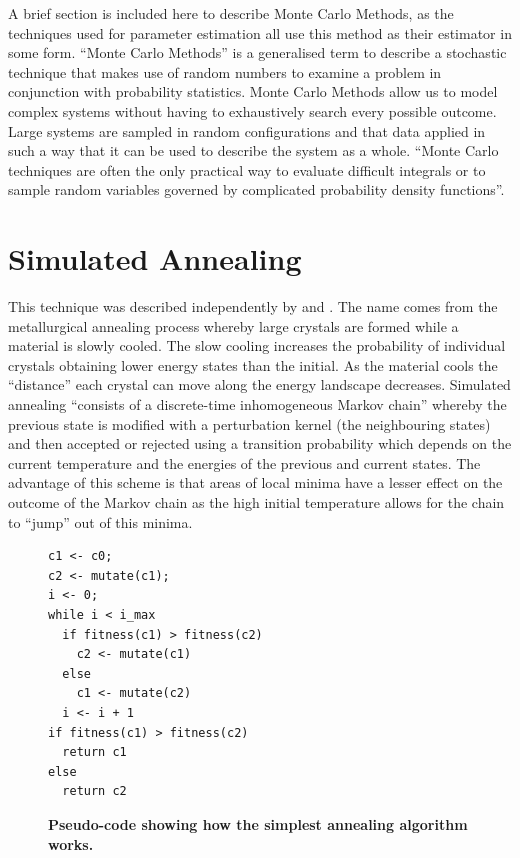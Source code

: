 A brief section is included here to describe Monte Carlo Methods, as the techniques used for parameter estimation all use this method as their estimator in some form.
``Monte Carlo Methods'' is a generalised term to describe a stochastic technique that makes use of random numbers to examine a problem in conjunction with probability statistics. Monte Carlo Methods allow us to model complex systems without having to exhaustively search every possible outcome. Large systems are sampled in random configurations and that data applied in such a way that it can be used to describe the system as a whole. ``Monte Carlo techniques are often the only practical way to evaluate difficult integrals or to sample random variables governed by complicated probability density functions''\cite{Nakamura2010}.

\section{Simulated Annealing}

This technique was described independently by \citet{Kirkpatrick1983} and \citet{Cerny1985}. The name comes from the metallurgical annealing process whereby large crystals are formed while a material is slowly cooled. The slow cooling increases the probability of individual crystals obtaining lower energy states than the initial. As the material cools the ``distance'' each crystal can move along the energy landscape decreases.
Simulated annealing ``consists of a discrete-time inhomogeneous Markov chain''\cite{Bertsimas1993} whereby the previous state is modified with a perturbation kernel (the neighbouring states) and then accepted or rejected using a transition probability which depends on the current temperature and the energies of the previous and current states. The advantage of this scheme is that areas of local minima have a lesser effect on the outcome of the Markov chain as the high initial temperature allows for the chain to ``jump'' out of this minima.

\begin{figure}[tbp]
\small
\begin{verbatim}
c1 <- c0;
c2 <- mutate(c1);
i <- 0;
while i < i_max
  if fitness(c1) > fitness(c2)
    c2 <- mutate(c1)
  else
    c1 <- mutate(c2)
  i <- i + 1
if fitness(c1) > fitness(c2)
  return c1
else
  return c2
\end{verbatim}
\caption[Pseudo-code showing how the simplest annealing algorithm works.]{{\bf Pseudo-code showing how the simplest annealing algorithm works.}
\label{fig:sa_code}}
\end{figure}

